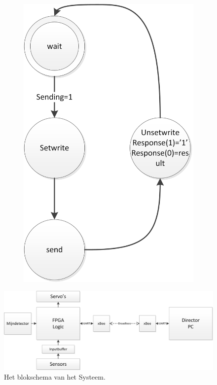 \documentclass{report}
\begin{document}
\begin{figure}
\begin{subfigure}{0.23\linewidth}
\includegraphics[width=\linewidth]{FSMSender}
\end{subfigure}
\end{figure}
\begin{figure}
\centering
\caption{Het blokschema van het Systeem.}
\label{fig:topLevelSystem}
\includegraphics[width=\textwidth]{top-level-system}
\end{figure}
\end{document}
